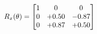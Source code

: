 \documentclass[preview]{standalone}
\begin{document}
\begin{align*}
\special{dvisvgm:raw <g id='unique000'>}R_{x}(\theta) = \begin{bmatrix}1 & 0 & 0 \\0 & +0.50 & -0.87 \\0 & +0.87 & +0.50\end{bmatrix}\special{dvisvgm:raw </g>}
\end{align*}
\end{document}
